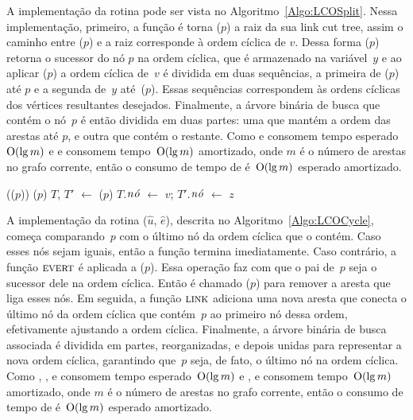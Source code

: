 A implementação da rotina \LCOSplit{} pode ser vista no Algoritmo~\ref{Algo:LCOSplit}.
Nessa implementação, primeiro, a função \linkcutEvert{} é torna \treapLast($p$) a raiz da sua link cut tree, assim o caminho entre \treapFirst($p$) e a raiz corresponde à ordem cíclica de $v$.
Dessa forma \linkcutParent($p$) retorna o sucessor do nó $p$ na ordem cíclica, que é armazenado na variável~$y$ e ao aplicar \linkcutDelEdge($p$) a ordem cíclica de~$v$ é dividida em duas sequências, a primeira de \treapFirst($p$) até $p$ e a segunda de~$y$ até~\treapLast($p$).
Essas sequências correspondem às ordens cíclicas dos vértices resultantes desejados.
Finalmente, a árvore binária de busca que contém o nó~$p$ é então dividida em duas partes: uma que mantém a ordem das arestas até $p$, e outra que contém o restante.
Como \treapLast{} e \treapSplitRight{} consomem tempo esperado~$\mathrm{O}(\lg m)$ e \linkcutEvert{} e \linkcutDelEdge{} consomem tempo~$\mathrm{O}(\lg m)$ amortizado, onde $m$ é o número de arestas no grafo corrente, então o consumo de tempo de \LCOSplit{} é~$\mathrm{O}(\lg m)$ esperado amortizado.

\begin{algorithm}[htb]
\caption{\LCOSplit($p$, $v$, $z$)}
\label{Algo:LCOSplit}
\begin{algorithmic}[1]
\State \linkcutEvert(\treapLast($p$))
\State \linkcutDelEdge($p$)
\State $T$, $T'$ $\gets$ \treapSplitRight($p$)
\State $T$.$\mathit{n\acute{o}}$ $\gets$ $v$; $T'$.$\mathit{n\acute{o}}$ $\gets$ $z$
\end{algorithmic}
\end{algorithm}


A implementação da rotina \LCOCycle($\hat u$, $\hat e$), descrita no Algoritmo~\ref{Algo:LCOCycle}, começa comparando~$p$ com o último nó da ordem cíclica que o contém.
Caso esses nós sejam iguais, então a função termina imediatamente.
Caso contrário, a função $\text{\scshape \text{\scshape evert}}$ é aplicada a \treapLast($p$).
Essa operação faz com que o pai de~$p$ seja o sucessor dele na ordem cíclica.
Então é chamado \linkcutDelEdge($p$) para remover a aresta que liga esses nós.
Em seguida, a função $\text{\scshape link}$ adiciona uma nova aresta que conecta o último nó da ordem cíclica que contém~$p$ ao primeiro nó dessa ordem, efetivamente ajustando a ordem cíclica.
Finalmente, a árvore binária de busca associada é dividida em partes, reorganizadas, e depois unidas para representar a nova ordem cíclica, garantindo que~$p$ seja, de fato, o último nó na ordem cíclica.
Como \treapFirst{}, \treapLast{}, \treapSplitRight{} e \treapJoin{} consomem tempo esperado~$\mathrm{O}(\lg m)$ e \linkcutEvert{}, \linkcutDelEdge{} e \linkcutAddEdge{} consomem tempo~$\mathrm{O}(\lg m)$ amortizado, onde $m$ é o número de arestas no grafo corrente, então o consumo de tempo de \LCOCycle{} é~$\mathrm{O}(\lg m)$ esperado amortizado.


